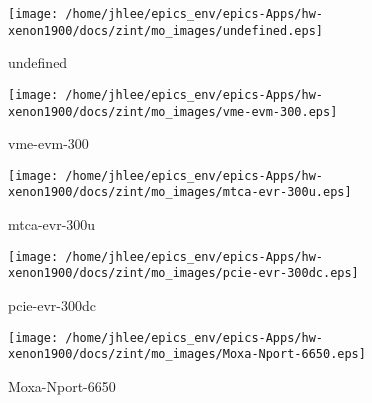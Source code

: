 \noindent
\vspace{1.4cm}
\begin{minipage}{.2\textwidth}
\begin{center}
\texttt{[image: /home/jhlee/epics\_env/epics-Apps/hw-xenon1900/docs/zint/mo\_images/undefined.eps]}
\end{center}
\end{minipage}
\begin{minipage}{.7\textwidth}
undefined
\end{minipage}


\noindent
\vspace{1.4cm}
\begin{minipage}{.2\textwidth}
\begin{center}
\texttt{[image: /home/jhlee/epics\_env/epics-Apps/hw-xenon1900/docs/zint/mo\_images/vme-evm-300.eps]}
\end{center}
\end{minipage}
\begin{minipage}{.7\textwidth}
vme-evm-300
\end{minipage}


\noindent
\vspace{1.4cm}
\begin{minipage}{.2\textwidth}
\begin{center}
\texttt{[image: /home/jhlee/epics\_env/epics-Apps/hw-xenon1900/docs/zint/mo\_images/mtca-evr-300u.eps]}
\end{center}
\end{minipage}
\begin{minipage}{.7\textwidth}
mtca-evr-300u
\end{minipage}


\noindent
\vspace{1.4cm}
\begin{minipage}{.2\textwidth}
\begin{center}
\texttt{[image: /home/jhlee/epics\_env/epics-Apps/hw-xenon1900/docs/zint/mo\_images/pcie-evr-300dc.eps]}
\end{center}
\end{minipage}
\begin{minipage}{.7\textwidth}
pcie-evr-300dc
\end{minipage}


\noindent
\vspace{1.4cm}
\begin{minipage}{.2\textwidth}
\begin{center}
\texttt{[image: /home/jhlee/epics\_env/epics-Apps/hw-xenon1900/docs/zint/mo\_images/Moxa-Nport-6650.eps]}
\end{center}
\end{minipage}
\begin{minipage}{.7\textwidth}
Moxa-Nport-6650
\end{minipage}


